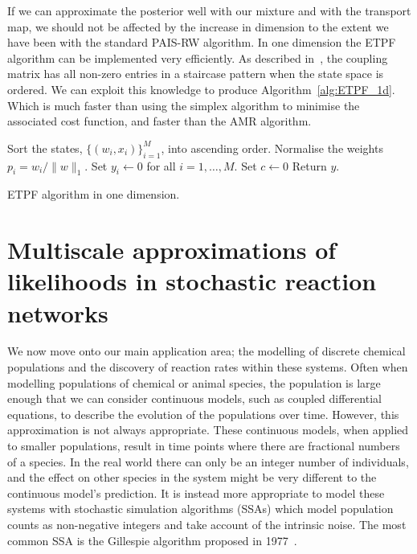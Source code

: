 \documentclass[final]{siamltex}
\begin{document}
If we can approximate the posterior well with our mixture and with the transport map, we should not be affected by the increase in dimension to the extent we have been with the standard PAIS-RW algorithm. In one dimension the ETPF algorithm can be implemented very efficiently. As described in~\cite{reich2013nonparametric}, the coupling matrix has all non-zero entries in a staircase pattern when the state space is ordered. We can exploit this knowledge to produce Algorithm~\ref{alg:ETPF_1d}. Which is much faster than using the simplex algorithm to minimise the associated cost function, and faster than the AMR algorithm.

\begin{table}[!htpb]
\begin{algorithm}[H]
\DontPrintSemicolon
\BlankLine
Sort the states, $\{(w_i, x_i)\}_{i=1}^M$, into ascending order.\;
Normalise the weights $p_i = w_i/\|w\|_1$.\;
Set $y_i \leftarrow 0$ for all $i=1,\dots,M$.\;
Set $c \leftarrow 0$\;
Return $y$.\;
\caption{ETPF algorithm in one dimension.\label{alg:ETPF_1d}}
\end{algorithm}
\end{table}


\section{Multiscale approximations of likelihoods in stochastic
  reaction networks}\label{sec:multi}

We now move onto our main application area; the modelling of discrete chemical populations and the discovery of reaction rates within these systems. Often when modelling populations of chemical or animal species, the population is large enough that we can consider continuous models, such as coupled differential equations, to describe the evolution of the populations over time. However, this approximation is not always appropriate. These continuous models, when applied to smaller populations, result in time points where there are fractional numbers of a species. In the real world there can only be an integer number of individuals, and the effect on other species in the system might be very different to the continuous model's prediction. It is instead more appropriate to model these systems with stochastic simulation algorithms (SSAs) which model population counts as non-negative integers and take account of the intrinsic noise. The most common SSA is the Gillespie algorithm proposed in 1977~\cite{gillespie1977exact}.
\end{document}
